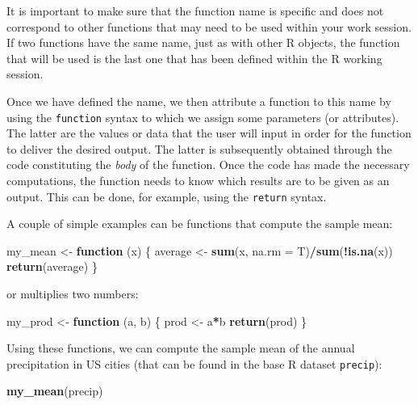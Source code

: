 \documentclass[12pt,]{krantz}
\newenvironment{Shaded}{\begin{snugshade}}{\end{snugshade}}
\newcommand{\KeywordTok}[1]{\textcolor[rgb]{0.27,0.27,0.27}{\textbf{#1}}}
\newcommand{\DataTypeTok}[1]{\textcolor[rgb]{0.27,0.27,0.27}{#1}}
\newcommand{\StringTok}[1]{\textcolor[rgb]{0.5,0.5,0.5}{#1}}
\newcommand{\ControlFlowTok}[1]{\textcolor[rgb]{0.27,0.27,0.27}{\textbf{#1}}}
\newcommand{\OperatorTok}[1]{\textcolor[rgb]{0.43,0.43,0.43}{\textbf{#1}}}
\newcommand{\NormalTok}[1]{#1}
\let\BeginKnitrBlock\begin \let\EndKnitrBlock\end
\begin{document}
\BeginKnitrBlock{rmdwarning}
It is important to make sure that the function name is specific and does
not correspond to other functions that may need to be used within your
work session. If two functions have the same name, just as with other R
objects, the function that will be used is the last one that has been
defined within the R working session.
\EndKnitrBlock{rmdwarning}

Once we have defined the name, we then attribute a function to this name
by using the \texttt{function} syntax to which we assign some parameters
(or attributes). The latter are the values or data that the user will
input in order for the function to deliver the desired output. The
latter is subsequently obtained through the code constituting the
\emph{body} of the function. Once the code has made the necessary
computations, the function needs to know which results are to be given
as an output. This can be done, for example, using the \texttt{return}
syntax.

A couple of simple examples can be functions that compute the sample
mean:

\begin{Shaded}
\begin{Highlighting}[]
\NormalTok{my_mean <-}\StringTok{ }\ControlFlowTok{function}\NormalTok{ (x) \{}
\NormalTok{  average <-}\StringTok{ }\KeywordTok{sum}\NormalTok{(x, }\DataTypeTok{na.rm =}\NormalTok{ T)}\OperatorTok{/}\KeywordTok{sum}\NormalTok{(}\OperatorTok{!}\KeywordTok{is.na}\NormalTok{(x))}
  \KeywordTok{return}\NormalTok{(average)}
\NormalTok{\}}
\end{Highlighting}
\end{Shaded}

or multiplies two numbers:

\begin{Shaded}
\begin{Highlighting}[]
\NormalTok{my_prod <-}\StringTok{ }\ControlFlowTok{function}\NormalTok{ (a, b) \{}
\NormalTok{  prod <-}\StringTok{ }\NormalTok{a}\OperatorTok{*}\NormalTok{b}
  \KeywordTok{return}\NormalTok{(prod)}
\NormalTok{\}}
\end{Highlighting}
\end{Shaded}

Using these functions, we can compute the sample mean of the annual
precipitation in US cities (that can be found in the base R dataset
\texttt{precip}):

\begin{Shaded}
\begin{Highlighting}[]
\KeywordTok{my_mean}\NormalTok{(precip)}
\end{Highlighting}
\end{Shaded}
\end{document}
